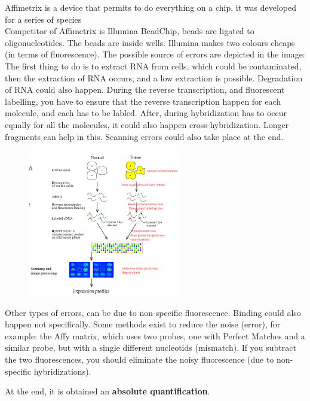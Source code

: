 Affimetrix is a device that permits to do everything on a chip, it was developed for a series of species\\
Competitor of Affimetrix is Illumina BeadChip, beads are ligated to oligonucleotides. The beads are inside wells. Illumina makes two colours cheaps (in terms of fluorescence). The possible source of errors are depicted in the image:
The first thing to do is to extract RNA from cells, which could be contaminated, then the extraction of RNA occurs, and a low extraction is possible. Degradation of RNA could also happen. During the reverse transcription, and fluorescent labelling, you have to ensure that the reverse transcription happen for each molecule, and each has to be labled. After, during hybridization has to occur equally for all the molecules, it could also happen cross-hybridization. Longer fragments can help in this. Scanning errors could also take place at the end.

\begin{figure}[h]
\caption{}
\centering
\includegraphics[width=0.6\textwidth]{ProblemsMicarrays}
\end{figure}

Other types of errors, can be due to non-specific fluorescence. Binding could also happen not specifically. Some methods exist to reduce the noise (error), for example: the Affy matrix, which uses two probes, one with Perfect Matches and a similar probe, but with a single different nucleotids (mismatch). If you subtract the two fluorescences, you should eliminate the noisy fluorescence (due to non-specific hybridizations).

At the end, it is obtained an \textbf{absolute quantification}.


